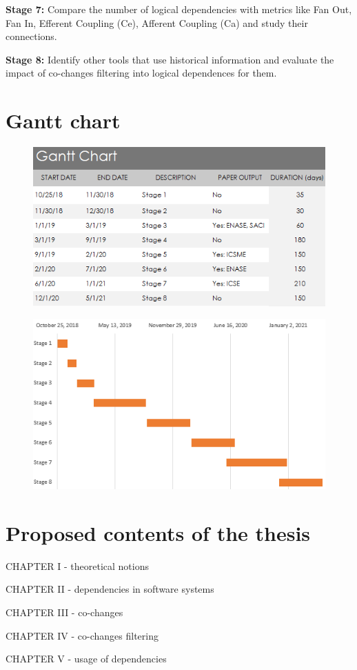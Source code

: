 \documentclass[12pt]{mitthesis}
\begin{document}
\textbf{Stage 7:} Compare the number of logical dependencies with metrics like Fan Out, Fan In, Efferent Coupling (Ce), Afferent Coupling (Ca) and study their connections.

\textbf{Stage 8:} Identify other tools that use historical information and evaluate the impact of co-changes filtering into logical dependences for them. 

\section{Gantt chart}

\begin{figure}[H]
\centering
\includegraphics[width=\textwidth]{gantt_chart.PNG}
\label{fig:gantt1}
\end{figure}

\begin{figure}[H]
\centering
\includegraphics[width=\textwidth]{gantt_plot.PNG}
\label{fig:gantt2}
\end{figure}

\section{Proposed contents of the thesis}

CHAPTER I - theoretical notions

CHAPTER II - dependencies in software systems

CHAPTER III - co-changes

CHAPTER IV - co-changes filtering

CHAPTER V - usage of dependencies




\end{document}
